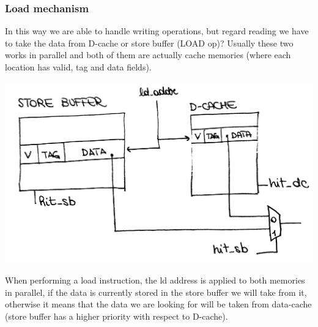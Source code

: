 \subsubsection{Load mechanism}
In this way we are able to handle writing operations, but regard reading we
have to take the data from D-cache or store buffer (LOAD op)? Usually these two
works in parallel and both of them are actually cache memories (where each
location has valid, tag and data fields).
\begin{center}
  \includegraphics[width=0.7\linewidth]{img/img3/31}
\end{center}
When performing a load instruction, the ld address is applied to both memories
in parallel, if the data is currently stored in the store buffer we will take
from it, otherwise it means that the data we are looking for will be taken from
data-cache (store buffer has a higher priority with respect to D-cache).
